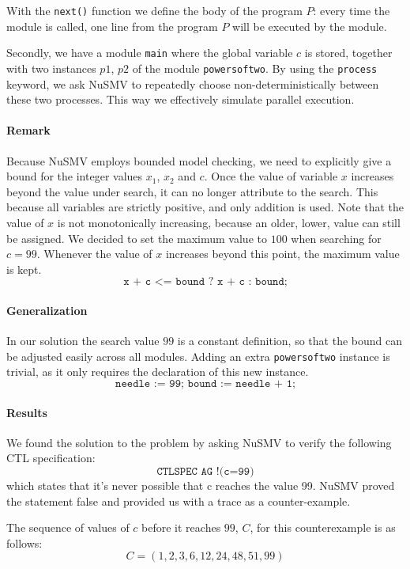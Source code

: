 \documentclass[12pt]{article}
\begin{document}
With the \texttt{next()} function we define the body of the program $P$: every time the module is called, one line from the program $P$ will be executed by the module.

Secondly, we have a module \texttt{main} where
the global variable $c$ is stored, 
together with two instances $p1$, $p2$ of the module \texttt{powersoftwo}.
By using the \texttt{process} keyword, 
we ask NuSMV to repeatedly choose non-deterministically 
between these two processes. 
This way we effectively simulate parallel execution.

\paragraph{Remark}
Because NuSMV employs bounded model checking, we need to explicitly give a bound for the integer values $x_1$, $x_2$ and $c$.
Once the value of variable $x$ increases beyond the value under search, it can no longer attribute to the search.
This because all variables are strictly positive, and only addition is used.
Note that the value of $x$ is not monotonically increasing, because an older, lower, value can still be assigned.
We decided to set the maximum value to $100$ when searching for $c = 99$.
Whenever the value of $x$ increases beyond this point, the maximum value is kept.
\[\texttt{x + c <= bound ? x + c : bound;}\]

\paragraph{Generalization}
In our solution the search value $99$ is a constant definition, so that the bound can be adjusted easily across all modules.
Adding an extra \texttt{powersoftwo} instance is trivial, as it only requires the declaration of this new instance.
\[\texttt{needle := 99; bound := needle + 1;}\]

\paragraph{Results}
We found the solution to the problem by asking NuSMV 
to verify the following CTL specification:
\[\texttt{CTLSPEC AG !(c=99)}\]
which states that it's never possible that c reaches the value 99.
NuSMV proved the statement false and 
provided us with a trace as a counter-example.

The sequence of values of $c$ before it reaches $99$, $C$, for this counterexample is as follows:
\[ C = ( 1, 2, 3, 6, 12, 24, 48, 51, 99 ) \]
\end{document}
